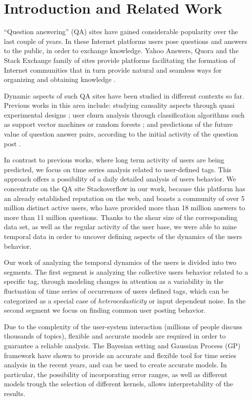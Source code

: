 \documentclass[../thesis.tex]{subfiles}
\begin{document}
\chapter{Introduction and Related Work}
\label{chap:Introduction}

``Question answering'' (QA) sites have gained considerable popularity over the last couple of 
years. In these Internet platforms users pose questions and answers to the public, in order to 
exchange knowledge. Yahoo Answers, Quora and the Stack Exchange family of sites provide platforms 
facilitating the formation of Internet communities that in turn provide natural and seamless ways 
for organizing and obtaining knowledge \cite{YahooKnowledge}. 

Dynamic aspects of such QA sites have been studied in different contexts so far. Previous works 
in this area include: studying causality aspects through quasi experimental designs \cite{Causal}; 
user churn analysis through classification algorithms such as support vector machines or random 
forests \cite{ChurnQA}; and predictions of the future value of question answer pairs, according 
to the initial activity of the question post \cite{StackLesko}. 

In contrast to previous works, where long term activity of users are being predicted, we focus 
on time series analysis related to user-defined tags. This approach offers a possibility of a 
daily detailed analysis of users behavior. We concentrate on the QA site Stackoverflow in our work, 
because this platform has an already established reputation on the web, and boasts a community of 
over 5 million distinct active users, who have provided more than 18 million answers to more than 
11 million questions. Thanks to the shear size of the corresponding data set, as well as 
the regular activity of the user base, we were able to mine temporal data in order to uncover 
defining aspects of the dynamics of the users behavior. 

Our work of analyzing the temporal dynamics of the users is divided into two 
segments. The first segment is analyzing the collective users behavior related to a 
specific tag, through modeling changes in attention as a variability in the fluctuation of time 
series of occurrences of users defined tags, which can be categorized as a special case of 
\textit{heterocedasticity} or input dependent noise. In the second segment we focus on finding 
common user posting behavior.

Due to the complexity of the user-system interaction (millions of people discuss thousands of 
topics), flexible and accurate models are required in order to guarantee a reliable analysis. 
The Bayesian setting and Gaussian Process (GP) framework \cite{GP} have shown to provide an 
accurate and flexible tool for time series analysis in the recent years, and can be used to create 
accurate models. In particular, the possibility of incorporating error ranges, as well as different 
models trough the selection of different kernels, allows interpretability of the results. 
\end{document}
